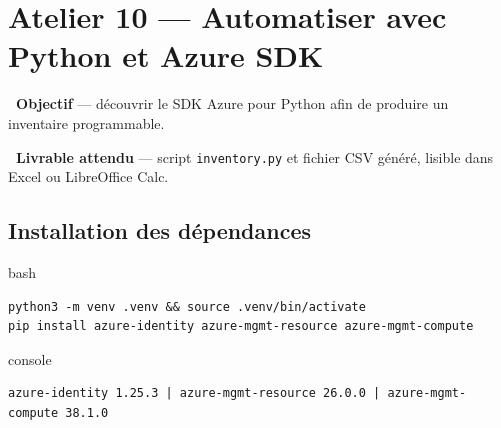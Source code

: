 \documentclass[11pt,a4paper]{article}
\newcommand{\emo}[1]{\raisebox{-0.14em}{\twemoji{#1}}}
\newcommand{\eTarget}{\emo{1f3af}}
\newcommand{\ePackage}{\emo{1f4e6}}
\newcommand{\code}[1]{\texttt{#1}}
\begin{document}
\section{Atelier 10 — Automatiser avec Python et Azure SDK}

\begin{fiche}
\textbf{\eTarget~Objectif} — découvrir le SDK Azure pour Python afin de produire un inventaire programmable.

\textbf{\ePackage~Livrable attendu} — script \code{inventory.py} et fichier CSV généré, lisible dans Excel ou LibreOffice Calc.
\end{fiche}

\subsection{Installation des dépendances}
\begin{codebox}{bash}
\begin{Verbatim}
python3 -m venv .venv && source .venv/bin/activate
pip install azure-identity azure-mgmt-resource azure-mgmt-compute
\end{Verbatim}
\end{codebox}
\begin{codebox}{console}
\begin{Verbatim}
azure-identity 1.25.3 | azure-mgmt-resource 26.0.0 | azure-mgmt-compute 38.1.0
\end{Verbatim}
\end{codebox}
\end{document}
